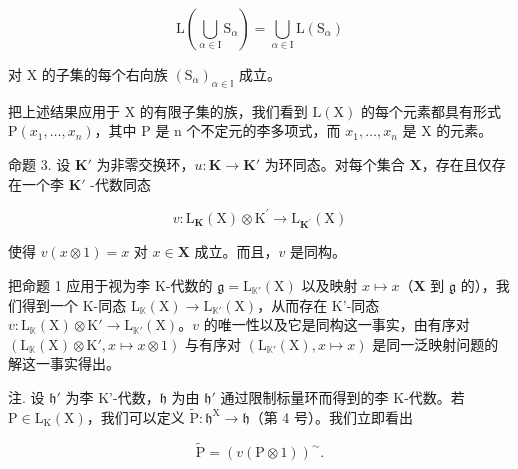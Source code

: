 \[
\mathrm{L} \left(\bigcup_ {\alpha \in \mathrm{I}} \mathrm{S} _ {\alpha}\right) = \bigcup_ {\alpha \in \mathrm{I}} \mathrm{L} (\mathrm{S} _ {\alpha})\tag{7}
\]

对 X 的子集的每个右向族 \((\mathrm{S}_{\alpha})_{\alpha\in\mathbb{I}}\) 成立。

把上述结果应用于 X 的有限子集的族，我们看到 \(\mathrm{L}(\mathrm{X})\) 的每个元素都具有形式 \(\mathrm{P}(x_{1},\ldots,x_{n})\)，其中 P 是 n 个不定元的李多项式，而 \(x_{1},\ldots,x_{n}\) 是 X 的元素。

命题 3. 设 \(\mathbf{K}'\) 为非零交换环，\(u: \mathbf{K} \to \mathbf{K}'\) 为环同态。对每个集合 \(\mathbf{X}\)，存在且仅存在一个李 \(\mathbf{K}'\) -代数同态

\[
v \colon \mathrm{L} _ {\mathbf {K}} (\mathrm{X}) \otimes \mathrm{K} ^ {\prime} \rightarrow \mathrm{L} _ {\mathbf {K} ^ {\prime}} (\mathrm{X})
\]

使得 \(v(x \otimes 1) = x\) 对 \(x \in \mathbf{X}\) 成立。而且，\(v\) 是同构。

把命题 1 应用于视为李 K-代数的 \(\mathfrak{g} = \mathrm{L}_{\mathbb{K}'}(\mathrm{X})\) 以及映射 \(x\mapsto x\)（\(\mathbf{X}\) 到 \(\mathfrak{g}\) 的），我们得到一个 K-同态 \(\mathrm{L}_{\mathbb{K}}(\mathrm{X})\to \mathrm{L}_{\mathbb{K}'}(\mathrm{X})\)，从而存在 K'-同态 \(v\colon \mathrm{L}_{\mathbb{K}}(\mathrm{X})\otimes \mathrm{K}'\to \mathrm{L}_{\mathbb{K}'}(\mathrm{X})\)。\(v\) 的唯一性以及它是同构这一事实，由有序对 \((\mathrm{L}_{\mathbb{K}}(\mathrm{X})\otimes \mathrm{K}',x\mapsto x\otimes 1)\) 与有序对 \((\mathrm{L}_{\mathbb{K}'}(\mathrm{X}),x\mapsto x)\) 是同一泛映射问题的解这一事实得出。

注. 设 \(\mathfrak{h}'\) 为李 K'-代数，\(\mathfrak{h}\) 为由 \(\mathfrak{h}'\) 通过限制标量环而得到的李 K-代数。若 \(\mathrm{P} \in \mathrm{L}_{\mathrm{K}}(\mathrm{X})\)，我们可以定义 \(\tilde{\mathrm{P}}: \mathfrak{h}^{\mathrm{X}} \to \mathfrak{h}\)（第 4 号）。我们立即看出

\[
\tilde {\mathrm{P}} = (v (\mathrm{P} \otimes 1)) ^ {\sim}.
\]
\relax{}
